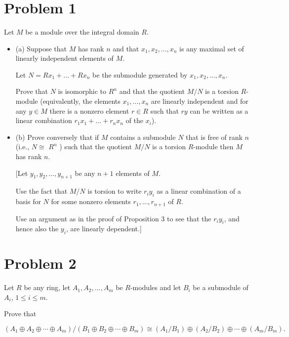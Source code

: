 \documentclass{article}
\begin{document}
\section*{Problem 1}\paragraph{}Let $M$ be a module over the integral domain $R$.
\begin{itemize}
    \item (a) Suppose that $M$ has rank $n$ and that $x_1, x_2, \ldots, x_n$ is any maximal set of linearly independent elements of $M$.

Let $N=R x_1+\ldots+R x_n$ be the submodule generated by $x_1, x_2, \ldots, x_n$.

Prove that $N$ is isomorphic to $R^n$ and that the quotient $M / N$ is a torsion $R$-module (equivalently, the elements $x_1, \ldots, x_n$ are linearly independent and for any $y \in M$ there is a nonzero element $r \in R$ such that $r y$ can be written as a linear combination $r_1 x_1+\ldots+r_n x_n$ of the $x_i$).

    \item (b) Prove conversely that if $M$ contains a submodule $N$ that is free of rank $n$ (i.e., $N \cong$ $R^n$ ) such that the quotient $M / N$ is a torsion $R$-module then $M$ has rank $n$.

[Let $y_1, y_2, \ldots, y_{n+1}$ be any $n+1$ elements of $M$.

Use the fact that $M / N$ is torsion to write $r_i y_i$ as a linear combination of a basis for $N$ for some nonzero elements $r_1, \ldots, r_{n+1}$ of $R$.

Use an argument as in the proof of Proposition 3 to see that the $r_i y_i$, and hence also the $y_i$, are linearly dependent.]

\end{itemize}

\section*{Problem 2}\paragraph{}Let $R$ be any ring, let $A_1, A_2, \ldots, A_m$ be $R$-modules and let $B_i$ be a submodule of $A_i$, $1 \leq i \leq m$.

Prove that

$$
\left(A_1 \oplus A_2 \oplus \cdots \oplus A_m\right) /\left(B_1 \oplus B_2 \oplus \cdots \oplus B_m\right) \cong\left(A_1 / B_1\right) \oplus\left(A_2 / B_2\right) \oplus \cdots \oplus\left(A_m / B_m\right) \text {.
}
$$
\end{document}
